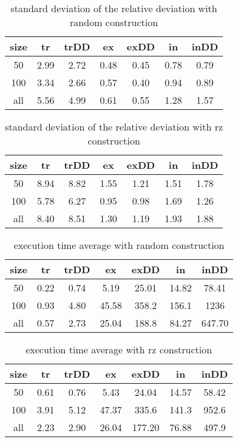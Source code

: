 \documentclass[12pt,a4paper]{article}
\begin{document}
\begin{table}[!h]
\centering
\begin{tabular}{|*{7}{c|}}
  \hline
  size & tr & trDD & ex & exDD & in & inDD \\
  \hline
  50 & 2.99 & 2.72 & 0.48 & 0.45 & 0.78 & 0.79 \\ 
  100 & 3.34 & 2.66 & 0.57 & 0.40 & 0.94 & 0.89 \\
  all & 5.56 & 4.99 & 0.61 & 0.55 & 1.28 & 1.57 \\
  \hline
\end{tabular}
\caption{standard deviation of the relative deviation with random construction}
\label{standard deviation of the relative deviation with random construction}
\end{table}


\begin{table}[!h]
\centering
\begin{tabular}{|*{7}{c|}}
  \hline
  size & tr & trDD & ex & exDD & in & inDD \\
  \hline
  50 & 8.94 & 8.82 & 1.55 & 1.21 & 1.51 & 1.78 \\ 
  100 & 5.78 & 6.27 & 0.95 & 0.98 & 1.69 & 1.26 \\
  all & 8.40 & 8.51 & 1.30 & 1.19 & 1.93 & 1.88 \\
  \hline
\end{tabular}
\caption{standard deviation of the relative deviation with rz construction}
\label{standard deviation of the relative deviation with rz construction}
\end{table}


\begin{table}[!h]
\centering
\begin{tabular}{|*{7}{c|}}
  \hline
  size & tr & trDD & ex & exDD & in & inDD \\
  \hline
  50 & 0.22 & 0.74 & 5.19 & 25.01 & 14.82 & 78.41 \\ 
  100 & 0.93 & 4.80 & 45.58 & 358.2 & 156.1 & 1236 \\
  all & 0.57 & 2.73 & 25.04 & 188.8 & 84.27 & 647.70 \\
  \hline
\end{tabular}
\caption{execution time average with random construction}
\label{Execution time with random construction}
\end{table}

\begin{table}[!h]
\centering
\begin{tabular}{|*{7}{c|}}
  \hline
  size & tr & trDD & ex & exDD & in & inDD \\
  \hline
  50 & 0.61 & 0.76 & 5.43 & 24.04 & 14.57 & 58.42 \\ 
  100 & 3.91 & 5.12 & 47.37 & 335.6 & 141.3 & 952.6 \\
  all & 2.23 & 2.90 & 26.04 & 177.20 & 76.88 & 497.9 \\
  \hline
\end{tabular}
\caption{execution time average with rz construction}
\label{Execution time with rz construction}
\end{table}
\end{document}
